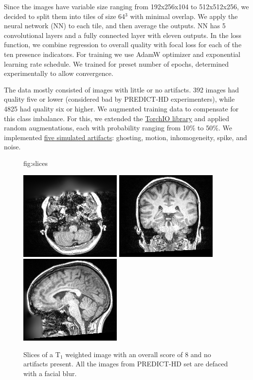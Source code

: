 \documentclass{midl} %
\begin{document}
Since the images have variable size ranging from 192x256x104 to 512x512x256, we decided to split them into tiles of size 64$^3$ with minimal overlap. We apply the neural network (NN) to each tile, and then average the outputs. NN has 5 convolutional layers and a fully connected layer with eleven outputs. In the loss function, we combine regression to overall quality with focal loss for each of the ten presence indicators. For training we use AdamW optimizer and exponential learning rate schedule. We trained for preset number of epochs, determined experimentally to allow convergence.

The data mostly consisted of images with little or no artifacts. 392 images had quality five or lower (considered bad by PREDICT-HD experimenters), while 4825 had quality six or higher. We augmented training data to compensate for this class imbalance. For this, we extended the \href{https://torchio.readthedocs.io/transforms/augmentation.html}{TorchIO library} and applied random augmentations, each with probability ranging from 10\% to 50\%. We implemented \href{https://github.com/OpenImaging/miqa/pull/339}{five simulated artifacts}: ghosting, motion, inhomogeneity, spike, and noise.


\begin{figure}[htbp]
\floatconts
  {fig:slices} %
  {\caption{Slices of a T$_1$ weighted image with an overall score of 8 and no artifacts present. All the images from PREDICT-HD set are defaced with a facial blur.}}
  {
  \includegraphics[width=0.32\linewidth]{axial.png}
  \includegraphics[width=0.32\linewidth]{coronal.png}
  \includegraphics[width=0.32\linewidth]{sagittal.png}
  }
\end{figure}
\end{document}
